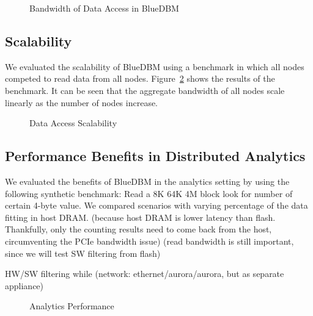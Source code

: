 \begin{figure}[h]
	\begin{center}
	\caption{Bandwidth of Data Access in BlueDBM}
	\label{fig:result_bandwidth}
	\end{center}
\end{figure}

\subsection{Scalability}

We evaluated the scalability of BlueDBM using a benchmark in which all nodes
competed to read data from all nodes. Figure~\ref{fig:result_scalability} shows
the results of the benchmark. It can be seen that the aggregate bandwidth of all
nodes scale linearly as the number of nodes increase.

\begin{figure}[h]
	\begin{center}
	\caption{Data Access Scalability}
	\label{fig:result_scalability}
	\end{center}
\end{figure}

%
%

\subsection{Performance Benefits in Distributed Analytics}

We evaluated the benefits of BlueDBM in the analytics setting by using the
following synthetic benchmark: Read a 8K 64K 4M block look for number of certain
4-byte value.
We compared scenarios with varying percentage of the data fitting in host DRAM.
(because host DRAM is lower latency than flash. Thankfully, only the counting
results need to come back from the host, circumventing the PCIe bandwidth issue)
(read bandwidth is still important, since we will test SW filtering from flash)

HW/SW filtering while (network: ethernet/aurora/aurora, but as separate
appliance)

\begin{figure}[h]
	\begin{center}
	\caption{Analytics Performance}
	\label{fig:result_analytics}
	\end{center}
\end{figure}
